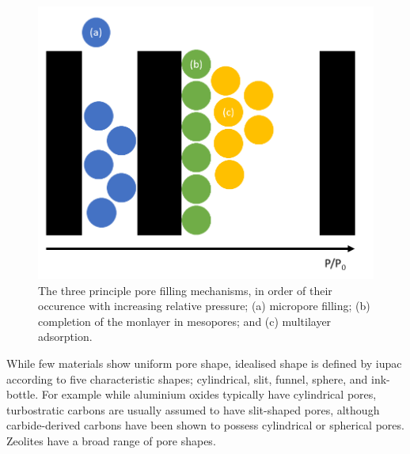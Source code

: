 \begin{figure}[t!]
    \centering
    \includegraphics[width=\columnwidth, keepaspectratio]{1-introduction/figs/pore_filling.png}
    \caption{The three principle pore filling mechanisms, in order of their occurence with increasing relative pressure; (a) micropore filling; (b) completion of the monlayer in mesopores; and (c) multilayer adsorption.}
    \label{fig:filling}
\end{figure}

While few materials show uniform pore shape, idealised shape is defined by \acrshort{iupac} according to five characteristic shapes; cylindrical, slit, funnel, sphere, and ink-bottle.\citep{rouquerol1994recommendations, kaneko1994determination, zdravkov2007pore} For example while aluminium oxides typically have cylindrical pores,\citep{zdravkov2007pore} \glspl{turbostratic carbon} are usually assumed to have slit-shaped pores,\citep{Everett1976Adsorption, Jagiello20132D, Lastoskie1993} although carbide-derived carbons have been shown to possess cylindrical or spherical pores.\citep{kurig2016suitability} Zeolites have a broad range of pore shapes.\citep{park2002effect} 

